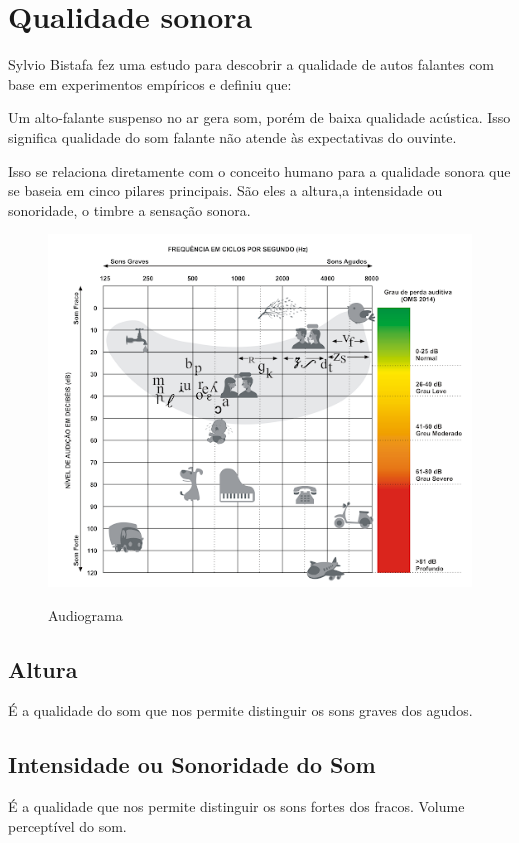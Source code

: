 \documentclass[
	article,			%
	11pt,				%
	oneside,			%
	a4paper,			%
	english,			%
	brazil,				%
	sumario=tradicional
	]{abntex2}
\begin{document}
\section{Qualidade sonora}
Sylvio Bistafa fez uma estudo para descobrir a qualidade de autos falantes com base em experimentos empíricos e definiu que:
\begin{citacao}
Um alto-falante suspenso no ar gera som, porém de baixa qualidade acústica. Isso significa qualidade do som falante não atende às expectativas do ouvinte.\cite{bistafa2018acustica}
\end{citacao}
Isso se relaciona diretamente com o conceito humano para a qualidade sonora que se baseia em cinco pilares principais. São eles a altura,a intensidade ou sonoridade, o timbre a sensação sonora.
\begin{figure}[h]
\caption{Audiograma}
\centering
\includegraphics{Audiograma de sons.png}
\label{Curvas de igual audibilidade ou
isofônicas}
\end{figure}

\subsection{Altura}
É a qualidade do som que nos permite distinguir os sons graves dos agudos.
\subsection{Intensidade ou Sonoridade do Som}
É a qualidade que nos permite distinguir os sons fortes dos fracos. Volume perceptível do som.
\end{document}
